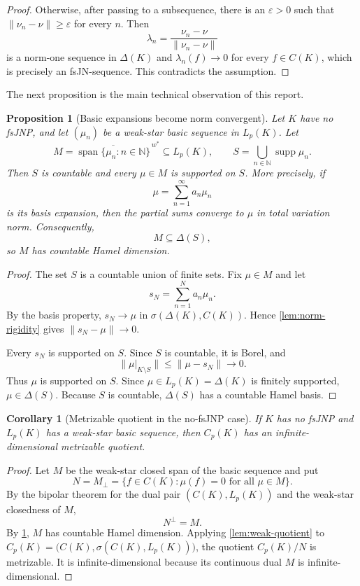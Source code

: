 \documentclass[11pt]{article}
\newtheorem{proposition}[theorem]{Proposition}
\newtheorem{corollary}[theorem]{Corollary}
\newcommand{\Cp}{C_p}
\newcommand{\Lp}{L_p}
\newcommand{\wstar}{w^*}
\newcommand{\supp}{\operatorname{supp}}
\newcommand{\spann}{\operatorname{span}}
\newcommand{\N}{\mathbb{N}}
\begin{document}
\begin{proof}
Otherwise, after passing to a subsequence, there is an $\varepsilon>0$ such that
$\|\nu_n-\nu\|\geq\varepsilon$ for every $n$.  Then
\[
 \lambda_n=\frac{\nu_n-\nu}{\|\nu_n-\nu\|}
\]
is a norm-one sequence in $\Delta(K)$ and $\lambda_n(f)\to0$ for every
$f\in C(K)$, which is precisely an fsJN-sequence.  This contradicts the
assumption.
\end{proof}

The next proposition is the main technical observation of this report.

\begin{proposition}[Basic expansions become norm convergent]\label{prop:norm}
Let $K$ have no fsJNP, and let $(\mu_n)$ be a weak-star basic sequence in
$\Lp(K)$.  Let
\[
 M=\overline{\spann\{\mu_n:n\in\N\}}^{\,\wstar}\subseteq\Lp(K),
 \qquad
 S=\bigcup_{n\in\N}\supp\mu_n.
\]
Then $S$ is countable and every $\mu\in M$ is supported on $S$.  More precisely,
if
\[
 \mu=\sum_{n=1}^{\infty}a_n\mu_n
\]
is its basis expansion, then the partial sums converge to $\mu$ in total
variation norm.  Consequently,
\[
 M\subseteq\Delta(S),
\]
so $M$ has countable Hamel dimension.
\end{proposition}

\begin{proof}
The set $S$ is a countable union of finite sets.  Fix $\mu\in M$ and let
\[
 s_N=\sum_{n=1}^N a_n\mu_n.
\]
By the basis property, $s_N\to\mu$ in
$\sigma(\Delta(K),C(K))$.  Hence \cref{lem:norm-rigidity} gives
$\|s_N-\mu\|\to0$.

Every $s_N$ is supported on $S$.  Since $S$ is countable, it is Borel, and
\[
 \bigl\|\mu|_{K\setminus S}\bigr\|
 \leq \|\mu-s_N\|\longrightarrow0.
\]
Thus $\mu$ is supported on $S$.  Since $\mu\in\Lp(K)=\Delta(K)$ is finitely
supported, $\mu\in\Delta(S)$.  Because $S$ is countable, $\Delta(S)$ has a
countable Hamel basis.
\end{proof}

\begin{corollary}[Metrizable quotient in the no-fsJNP case]
\label{cor:groth-quotient}
If $K$ has no fsJNP and $\Lp(K)$ has a weak-star basic sequence, then
$\Cp(K)$ has an infinite-dimensional metrizable quotient.
\end{corollary}

\begin{proof}
Let $M$ be the weak-star closed span of the basic sequence and put
\[
 N=M_\perp=\{f\in C(K):\mu(f)=0\text{ for all }\mu\in M\}.
\]
By the bipolar theorem for the dual pair $(C(K),\Lp(K))$ and the weak-star
closedness of $M$,
\[
 N^\perp=M.
\]
By \cref{prop:norm}, $M$ has countable Hamel dimension.  Applying
\cref{lem:weak-quotient} to
$\Cp(K)=\bigl(C(K),\sigma(C(K),\Lp(K))\bigr)$, the quotient
$\Cp(K)/N$ is metrizable.  It is infinite-dimensional because its continuous
dual $M$ is infinite-dimensional.
\end{proof}
\end{document}
